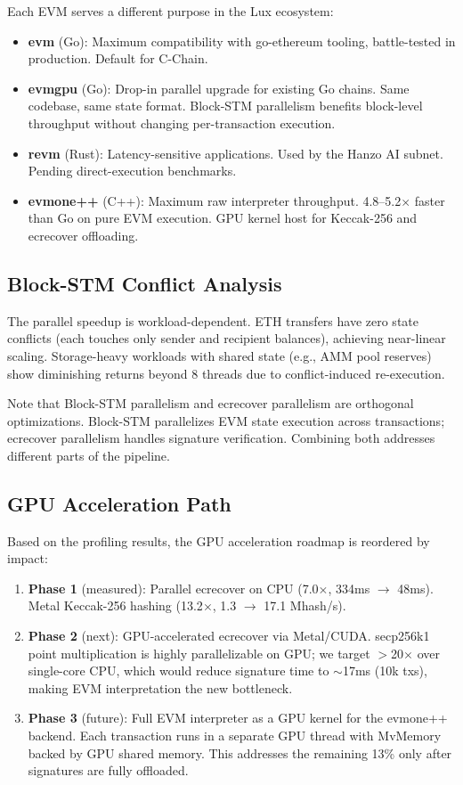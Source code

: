 \documentclass[11pt,twocolumn]{article}
\begin{document}
Each EVM serves a different purpose in the Lux ecosystem:

\begin{itemize}
\item \textbf{evm} (Go): Maximum compatibility with go-ethereum tooling,
      battle-tested in production. Default for C-Chain.
\item \textbf{evmgpu} (Go): Drop-in parallel upgrade for existing Go chains.
      Same codebase, same state format. Block-STM parallelism benefits
      block-level throughput without changing per-transaction execution.
\item \textbf{revm} (Rust): Latency-sensitive applications. Used by the Hanzo
      AI subnet. Pending direct-execution benchmarks.
\item \textbf{evmone++} (C++): Maximum raw interpreter throughput.
      4.8--5.2$\times$ faster than Go on pure EVM execution. GPU kernel
      host for Keccak-256 and ecrecover offloading.
\end{itemize}

\subsection{Block-STM Conflict Analysis}

The parallel speedup is workload-dependent. ETH transfers have zero state conflicts
(each touches only sender and recipient balances), achieving near-linear scaling.
Storage-heavy workloads with shared state (e.g., AMM pool reserves) show diminishing
returns beyond 8 threads due to conflict-induced re-execution.

Note that Block-STM parallelism and ecrecover parallelism are orthogonal optimizations.
Block-STM parallelizes EVM state execution across transactions; ecrecover parallelism
handles signature verification. Combining both addresses different parts of the pipeline.

\subsection{GPU Acceleration Path}

Based on the profiling results, the GPU acceleration roadmap is reordered by impact:

\begin{enumerate}
\item \textbf{Phase 1} (measured): Parallel ecrecover on CPU (7.0$\times$, 334ms $\to$ 48ms).
      Metal Keccak-256 hashing (13.2$\times$, 1.3 $\to$ 17.1 Mhash/s).
\item \textbf{Phase 2} (next): GPU-accelerated ecrecover via Metal/CUDA.
      secp256k1 point multiplication is highly parallelizable on GPU; we target
      $>$20$\times$ over single-core CPU, which would reduce signature time to
      $\sim$17ms (10k txs), making EVM interpretation the new bottleneck.
\item \textbf{Phase 3} (future): Full EVM interpreter as a GPU kernel for the
      evmone++ backend. Each transaction runs in a separate GPU thread with
      MvMemory backed by GPU shared memory. This addresses the remaining 13\%
      only after signatures are fully offloaded.
\end{enumerate}
\end{document}

